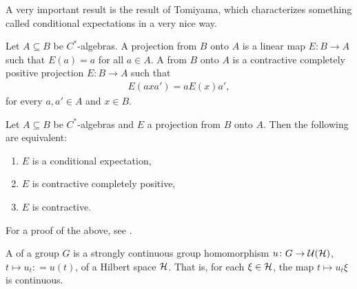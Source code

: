 A very important result is the result of Tomiyama, which characterizes something called conditional expectations in a very nice way.
\begin{defnonum}
	Let $A \subseteq B$ be $C^*$-algebras. A projection from $B$ onto $A$ is a linear map $E \colon B \to A$ such that $E(a)=a$ for all $a \in A$. A  from $B$ onto $A$ is a contractive completely positive projection $E \colon B \to A$ such that
	\begin{align*}
		E(axa')=a E(x) a',
	\end{align*}
	for every $a,a' \in A$ and $x \in B$.
\end{defnonum}
\begin{thmnonum}
	Let $A \subseteq B$ be $C^*$-algebras and $E$ a projection from $B$ onto $A$. Then the following are equivalent:
	\begin{enumerate}
		\item $E$ is a conditional expectation,
		\item $E$ is contractive completely positive,
		\item $E$ is contractive.
	\end{enumerate}
\end{thmnonum}
For a proof of the above, see \cite[Theorem 1.5.10]{brown2008c}.
\begin{defnonum}
	A  of a group $G$ is a strongly continuous group homomorphism $u \colon G \to \mathcal{U}(\mathcal{H})$, $t \mapsto u_t: = u(t)$, of a Hilbert space $\mathcal{H}$. That is, for each $\xi \in \mathcal{H}$, the map $t \mapsto u_t \xi$ is continuous. 
\end{defnonum}

